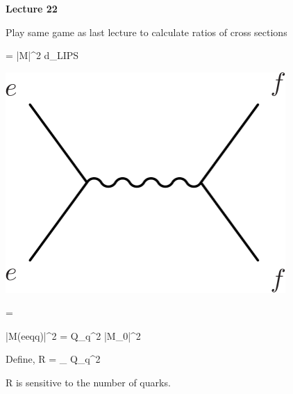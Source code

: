 



\thispagestyle{fancy}

\begin{center}
{\huge \textbf{Lecture 22}}
\end{center}

{\fontsize{14}{16}\selectfont


Play same game as last lecture to calculate ratios of cross sections

\begin{minipage}{0.6\textwidth}
\be
\sigma =   |M|^2 d\Pi_{LIPS}
\ee
\end{minipage} \hfill
\begin{minipage}{0.3\textwidth}
\includegraphics[width=0.8\textwidth]{./eeToff.pdf}
\end{minipage} 



\be
{} = 
\ee

\be
|M(ee\rightarrow qq)|^2 = Q_q^2 |M_0|^2
\ee

Define,
\be
R \equiv {} = \sum_{} Q_q^2
\ee

R is sensitive to the number of quarks.


}
